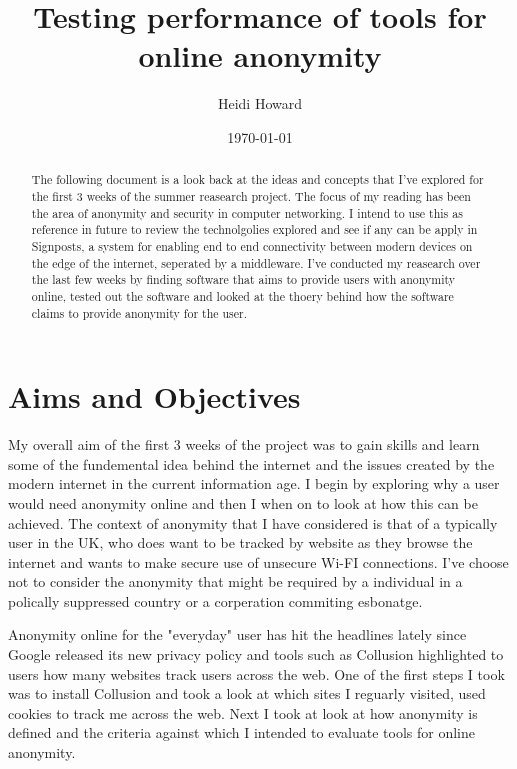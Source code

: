 \documentclass[12pt,a4paper,oneside]{article}
\begin{document}
\title{Testing performance of tools for online anonymity }
\author{Heidi Howard}
\date{\today}
\maketitle
\tableofcontents

\begin{abstract}
The following document is a look back at the ideas and concepts that I've explored for the first 3 weeks of the summer reasearch project. The focus of my reading has been the area of anonymity and security in computer networking. I intend to use this as reference in future to review the technolgolies explored and see if any can be apply in Signposts, a system for enabling end to end connectivity between modern devices on the edge of the internet, seperated by a middleware. I've conducted my reasearch over the last few weeks by finding software that aims to provide users with anonymity online, tested out the software and looked at the thoery behind how the software claims to provide anonymity for the user.
\end{abstract}


\section{Aims and Objectives}
My overall aim of the first 3 weeks of the project was to gain skills and learn some of the fundemental idea behind the internet and the issues created by the modern internet in the current information age. I begin by exploring why a user would need anonymity online and then I when on to look at how this can be achieved. The context of anonymity that I have considered is that of a typically user in the UK, who does want to be tracked by website as they browse the internet and wants to make secure use of unsecure Wi-FI connections. I've choose not to consider the anonymity that might be required by a individual in a polically suppressed country or a corperation commiting esbonatge.

Anonymity online for the "everyday" user has hit the headlines lately since Google released its new privacy policy and tools such as Collusion highlighted to users how many websites track users across the web. One of the first steps I took was to install Collusion and took a look at which sites I reguarly visited, used cookies to track me across the web. Next I took at look at how anonymity is defined and the criteria against which I intended to evaluate tools for online anonymity.
\end{document}
